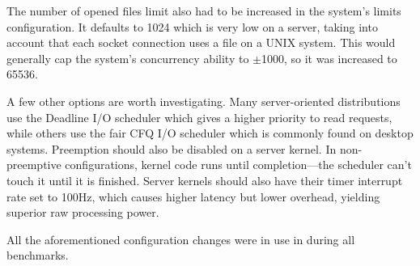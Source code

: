 The number of opened files limit also had to be increased in the system's limits configuration. It defaults to 1024 which is very low on a server, taking into account that each socket connection uses a file on a UNIX system. This would generally cap the system's concurrency ability to $\pm$1000, so it was increased to 65536.

A few other options are worth investigating. Many server-oriented distributions use the Deadline I/O scheduler which gives a higher priority to read requests, while others use the fair CFQ I/O scheduler which is commonly found on desktop systems. Preemption should also be disabled on a server kernel. In non-preemptive configurations, kernel code runs until completion---the scheduler can't touch it until it is finished. Server kernels should also have their timer interrupt rate set to 100Hz, which causes higher latency but lower overhead, yielding superior raw processing power.

All the aforementioned configuration changes were in use in during all benchmarks.
